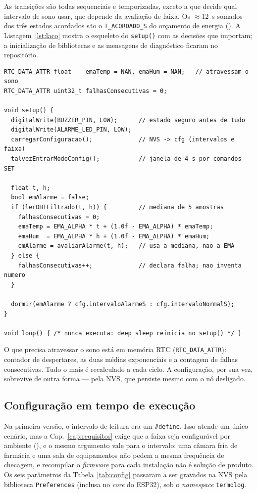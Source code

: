 As transições são todas sequenciais e temporizadas, exceto a que decide
qual intervalo de sono usar, que depende da avaliação de faixa. Os
$\approx$\SI{12}{\second} somados dos três estados acordados são o
\texttt{T\_ACORDADO\_S} do orçamento de energia (\bancada). A
Listagem~\ref{lst:laco} mostra o esqueleto do \texttt{setup()} com as
decisões que importam; a inicialização de bibliotecas e as mensagens de
diagnóstico ficaram no repositório.

\begin{lstlisting}[style=arduino,
  caption={Esqueleto do ciclo: tudo mora no \texttt{setup()}, e o intervalo de sono é decidido no fim},
  label={lst:laco}]
RTC_DATA_ATTR float    emaTemp = NAN, emaHum = NAN;   // atravessam o sono
RTC_DATA_ATTR uint32_t falhasConsecutivas = 0;

void setup() {
  digitalWrite(BUZZER_PIN, LOW);      // estado seguro antes de tudo
  digitalWrite(ALARME_LED_PIN, LOW);
  carregarConfiguracao();             // NVS -> cfg (intervalos e faixa)
  talvezEntrarModoConfig();           // janela de 4 s por comandos SET

  float t, h;
  bool emAlarme = false;
  if (lerDHTFiltrado(t, h)) {         // mediana de 5 amostras
    falhasConsecutivas = 0;
    emaTemp = EMA_ALPHA * t + (1.0f - EMA_ALPHA) * emaTemp;
    emaHum  = EMA_ALPHA * h + (1.0f - EMA_ALPHA) * emaHum;
    emAlarme = avaliarAlarme(t, h);   // usa a mediana, nao a EMA
  } else {
    falhasConsecutivas++;             // declara falha; nao inventa numero
  }

  dormir(emAlarme ? cfg.intervaloAlarmeS : cfg.intervaloNormalS);
}

void loop() { /* nunca executa: deep sleep reinicia no setup() */ }
\end{lstlisting}

O que precisa atravessar o sono está em memória RTC
(\texttt{RTC\_DATA\_ATTR}): contador de despertares, as duas médias
exponenciais e a contagem de falhas consecutivas. Tudo o mais é
recalculado a cada ciclo. A configuração, por sua vez, sobrevive de
outra forma --- pela NVS, que persiste mesmo com o nó desligado.

\subsection{Configuração em tempo de execução}
\label{sec:config}

Na primeira versão, o intervalo de leitura era um \texttt{\#define}.
Isso atende um único cenário, mas a Cap.~\ref{cap:requisitos} exige
que a faixa seja configurável por ambiente (), e o mesmo
argumento vale para o intervalo: uma câmara fria de farmácia e uma sala
de equipamentos não pedem a mesma frequência de checagem, e recompilar
o \emph{firmware} para cada instalação não é solução de produto. Os
seis parâmetros da Tabela~\ref{tab:config} passaram a ser gravados na
NVS pela biblioteca \texttt{Preferences} (inclusa no \emph{core} do
ESP32), sob o \emph{namespace} \texttt{termolog}.

